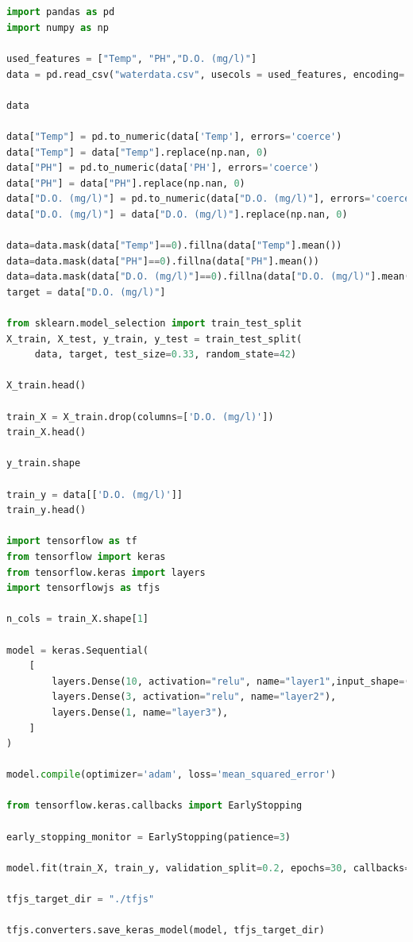 \begin{lstlisting}[language=python, caption={ANN Model Tensorflow API}]


import pandas as pd
import numpy as np

used_features = ["Temp", "PH","D.O. (mg/l)"]
data = pd.read_csv("waterdata.csv", usecols = used_features, encoding= 'unicode_escape')

data

data["Temp"] = pd.to_numeric(data['Temp'], errors='coerce')
data["Temp"] = data["Temp"].replace(np.nan, 0)
data["PH"] = pd.to_numeric(data['PH'], errors='coerce')
data["PH"] = data["PH"].replace(np.nan, 0)
data["D.O. (mg/l)"] = pd.to_numeric(data["D.O. (mg/l)"], errors='coerce')
data["D.O. (mg/l)"] = data["D.O. (mg/l)"].replace(np.nan, 0)

data=data.mask(data["Temp"]==0).fillna(data["Temp"].mean())
data=data.mask(data["PH"]==0).fillna(data["PH"].mean())
data=data.mask(data["D.O. (mg/l)"]==0).fillna(data["D.O. (mg/l)"].mean())
target = data["D.O. (mg/l)"]

from sklearn.model_selection import train_test_split
X_train, X_test, y_train, y_test = train_test_split(
     data, target, test_size=0.33, random_state=42)

X_train.head()

train_X = X_train.drop(columns=['D.O. (mg/l)'])
train_X.head()

y_train.shape

train_y = data[['D.O. (mg/l)']]
train_y.head()

import tensorflow as tf
from tensorflow import keras
from tensorflow.keras import layers
import tensorflowjs as tfjs

n_cols = train_X.shape[1]

model = keras.Sequential(
    [
        layers.Dense(10, activation="relu", name="layer1",input_shape=(n_cols,)),
        layers.Dense(3, activation="relu", name="layer2"),
        layers.Dense(1, name="layer3"),
    ]
)

model.compile(optimizer='adam', loss='mean_squared_error')

from tensorflow.keras.callbacks import EarlyStopping

early_stopping_monitor = EarlyStopping(patience=3)

model.fit(train_X, train_y, validation_split=0.2, epochs=30, callbacks=[early_stopping_monitor])

tfjs_target_dir = "./tfjs"

tfjs.converters.save_keras_model(model, tfjs_target_dir)


\end{lstlisting}
